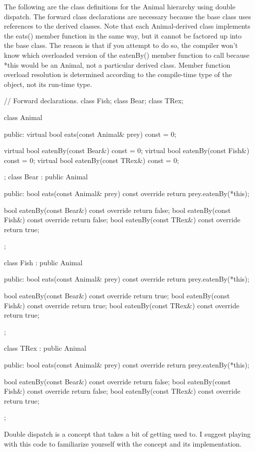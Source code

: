 The following are the class definitions for the Animal hierarchy using double dispatch. The forward class declarations are necessary because the base class uses references to the derived classes. Note that each Animal-derived class implements the eats() member function in the same way, but it cannot be factored up into the base class. The reason is that if you attempt to do so, the compiler won’t know which overloaded version of the eatenBy() member function to call because *this would be an Animal, not a particular derived class. Member function overload resolution is determined according to the compile-time type of the object, not its run-time type.

\begin{cpp}
// Forward declarations.
class Fish;
class Bear;
class TRex;

class Animal
{
    public:
        virtual bool eats(const Animal& prey) const = 0;

        virtual bool eatenBy(const Bear&) const = 0;
        virtual bool eatenBy(const Fish&) const = 0;
        virtual bool eatenBy(const TRex&) const = 0;
};
class Bear : public Animal
{
    public:
        bool eats(const Animal& prey) const override{ return prey.eatenBy(*this); }

        bool eatenBy(const Bear&) const override { return false; }
        bool eatenBy(const Fish&) const override { return false; }
        bool eatenBy(const TRex&) const override { return true; }
};

class Fish : public Animal
{
    public:
        bool eats(const Animal& prey) const override{ return prey.eatenBy(*this); }

        bool eatenBy(const Bear&) const override { return true; }
        bool eatenBy(const Fish&) const override { return true; }
        bool eatenBy(const TRex&) const override { return true; }
};

class TRex : public Animal
{
    public:
        bool eats(const Animal& prey) const override{ return prey.eatenBy(*this); }

        bool eatenBy(const Bear&) const override { return false; }
        bool eatenBy(const Fish&) const override { return false; }
        bool eatenBy(const TRex&) const override { return true; }
};
\end{cpp}

Double dispatch is a concept that takes a bit of getting used to. I suggest playing with this code to familiarize yourself with the concept and its implementation.

